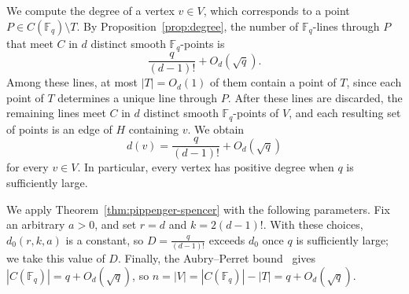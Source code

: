 \documentclass[10pt,a4paper]{amsart}
\theoremstyle{definition}
\theoremstyle{remark}
\newcommand{\Fq}{\mathbb{F}_q}
\begin{document}
We compute the degree of a vertex $v\in V$, which corresponds to a point $P\in C(\Fq)\setminus T$. By Proposition~\ref{prop:degree}, the number of $\Fq$-lines through $P$ that meet $C$ in $d$ distinct smooth $\Fq$-points is
\[
\frac{q}{(d-1)!}+O_d(\sqrt q).
\]
Among these lines, at most $|T|=O_d(1)$ of them contain a point of $T$, since each point of $T$ determines a unique line through $P$. After these lines are discarded, the remaining lines meet $C$ in $d$
distinct smooth $\Fq$-points of $V$, and each resulting set of points
is an edge of $H$ containing $v$. We obtain
\begin{equation}\label{eq:degree-of-a-vertex}
d(v)=\frac{q}{(d-1)!}+O_d(\sqrt q)
\end{equation}
for every $v\in V$. In particular, every vertex has positive degree when $q$ is sufficiently large.

We apply Theorem~\ref{thm:pippenger-spencer} with the following parameters. Fix an arbitrary $a>0$, and set $r=d$ and $k=2(d-1)!$. With these choices, $d_0(r,k,a)$ is a constant, so $D=\frac{q}{(d-1)!}$ exceeds $d_0$ once $q$ is sufficiently large; we take this value of $D$. Finally, the Aubry--Perret bound~\cite{AP96} gives $|C(\Fq)|=q+O_d(\sqrt q)$, so $n=|V|=|C(\Fq)|-|T|=q+O_d(\sqrt q)$.
\end{document}
